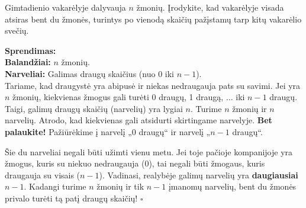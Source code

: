 \documentclass[11pt,a4paper]{scrartcl}
\newenvironment{solution}
    {\begin{list}{}{\setlength{\leftmargin}{10pt}\setlength{\rightmargin}{10pt}}\item[]}
    {\end{list}}
\begin{document}
\begin{example}
Gimtadienio vakarėlyje dalyvauja $n$ žmonių. Įrodykite, kad vakarėlyje visada atsiras bent du žmonės, turintys po vienodą skaičių pažįstamų tarp kitų vakarėlio svečių.
\end{example}

\begin{solution}
\textbf{Sprendimas:} \\
\textbf{Balandžiai:} $n$ žmonių.\\
\textbf{Narveliai:} Galimas draugų skaičius (nuo $0$ iki $n-1$).\\

Tariame, kad draugystė yra abipusė ir niekas nedraugauja pats su savimi. Jei yra $n$ žmonių, kiekvienas žmogus gali turėti 0 draugų, 1 draugą, $\dots$ iki $n-1$ draugų. Taigi, galimų draugų skaičių (narvelių) yra lygiai $n$.
Turime $n$ žmonių ir $n$ narvelių. Atrodo, kad kiekvienas gali atsidurti skirtingame narvelyje. 
\textbf{Bet palaukite!} Pažiūrėkime į narvelį „0 draugų“ ir narvelį „$n-1$ draugų“.

\begin{center}
\end{center}

Šie du narveliai negali būti užimti vienu metu. Jei toje pačioje kompanijoje yra žmogus, kuris su niekuo nedraugauja (0), tai negali būti žmogaus, kuris draugauja su visais ($n-1$). Vadinasi, realybėje galimų narvelių yra \textbf{daugiausiai $n-1$}. 
Kadangi turime $n$ žmonių ir tik $n-1$ įmanomų narvelių, bent du žmonės privalo turėti tą patį draugų skaičių! \hfill $\square$
\end{solution}
\end{document}
